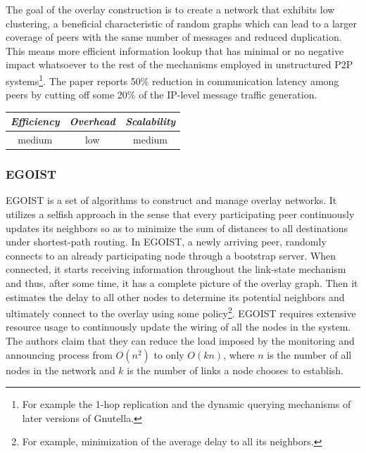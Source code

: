The goal of the overlay construction is to create a network that exhibits low
clustering, a beneficial characteristic of random graphs which can lead to a
larger coverage of peers with the same number of messages and reduced
duplication. This means more efficient information lookup that has minimal or no
negative impact whatsoever to the rest of the mechanisms employed in
unstructured P2P systems\footnote{For example the 1-hop replication and the
dynamic querying mechanisms of later versions of Gnutella.}. The paper reports
50\% reduction in communication latency among peers by cutting off some 20\% of
the IP-level message traffic generation.

\begin{center}
\begin{tabular}{ccc}
\emph{Efficiency} & \emph{Overhead} & \emph{Scalability} \\
\hline
medium &
low &
medium
\end{tabular}
\end{center}

\subsubsection{EGOIST}
EGOIST \cite{SLLBBR2008} is a set of algorithms to construct and manage overlay
networks. It utilizes a selfish approach in the sense that every participating
peer continuously updates its neighbors so as to minimize the sum of distances
to all destinations under shortest-path routing. In EGOIST, a newly arriving
peer, randomly connects to an already participating node through a bootstrap
server. When connected, it starts receiving information throughout the
link-state mechanism and thus, after some time, it has a complete picture of the
overlay graph. Then it estimates the delay to all other nodes to
determine its potential neighbors and ultimately connect to the overlay using
some policy\footnote{For example, minimization of the average delay to all its
neighbors.}. EGOIST requires extensive resource usage to continuously update the
wiring of all the nodes in the system. The authors claim that they can
reduce the load imposed by the monitoring and announcing process from $O(n^2)$
to only $O(kn)$, where $n$ is the number of all nodes in the network and $k$ is
the number of links a node chooses to establish.

